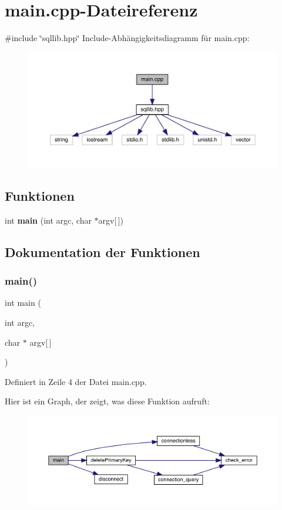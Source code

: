 \section{main.\+cpp-\/\+Dateireferenz}
\label{main_8cpp}
{\ttfamily \#include \char`\"{}sqllib.\+hpp\char`\"{}}\newline
Include-\/\+Abhängigkeitsdiagramm für main.\+cpp\+:\nopagebreak
\begin{figure}[H]
\begin{center}
\leavevmode
\includegraphics[width=350pt]{main_8cpp__incl}
\end{center}
\end{figure}
\subsection*{Funktionen}
\begin{DoxyCompactItemize}
\item 
int \textbf{ main} (int argc, char $\ast$argv[$\,$])
\end{DoxyCompactItemize}


\subsection{Dokumentation der Funktionen}
\mbox{\label{main_8cpp_a0ddf1224851353fc92bfbff6f499fa97}} 
\subsubsection{main()}
{\footnotesize\ttfamily int main (\begin{DoxyParamCaption}\item[{int}]{argc,  }\item[{char $\ast$}]{argv[$\,$] }\end{DoxyParamCaption})}



Definiert in Zeile 4 der Datei main.\+cpp.

Hier ist ein Graph, der zeigt, was diese Funktion aufruft\+:\nopagebreak
\begin{figure}[H]
\begin{center}
\leavevmode
\includegraphics[width=350pt]{main_8cpp_a0ddf1224851353fc92bfbff6f499fa97_cgraph}
\end{center}
\end{figure}
